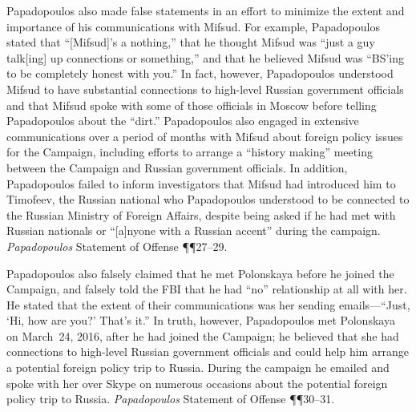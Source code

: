 Papadopoulos also made false statements in an effort to minimize the extent and importance of his communications with Mifsud.
For example, Papadopoulos stated that ``[Mifsud]'s a nothing,'' that he thought Mifsud was ``just a guy talk[ing] up connections or something,'' and that he believed Mifsud was ``BS'ing to be completely honest with you.''
In fact, however, Papadopoulos understood Mifsud to have substantial connections to high-level Russian government officials and that Mifsud spoke with some of those officials in Moscow before telling Papadopoulos about the ``dirt.''
Papadopoulos also engaged in extensive communications over a period of months with Mifsud about foreign policy issues for the Campaign, including efforts to arrange a ``history making'' meeting between the Campaign and Russian government officials.
In addition, Papadopoulos failed to inform investigators that Mifsud had introduced him to Timofeev, the Russian national who Papadopoulos understood to be connected to the Russian Ministry of Foreign Affairs, despite being asked if he had met with Russian nationals or ``[a]nyone with a Russian accent'' during the campaign.
\textit{Papadopoulos} Statement of Offense \P\P 27--29.

Papadopoulos also falsely claimed that he met Polonskaya before he joined the Campaign, and falsely told the FBI that he had ``no'' relationship at all with her.
He stated that the extent of their communications was her sending emails---``Just, `Hi, how are you?' That's it.''
In truth, however, Papadopoulos met Polonskaya on March~24, 2016, after he had joined the Campaign; he believed that she had connections to high-level Russian government officials and could help him arrange a potential foreign policy trip to Russia.
During the campaign he emailed and spoke with her over Skype on numerous occasions about the potential foreign policy trip to Russia.
\textit{Papadopoulos} Statement of Offense \P\P 30--31.

